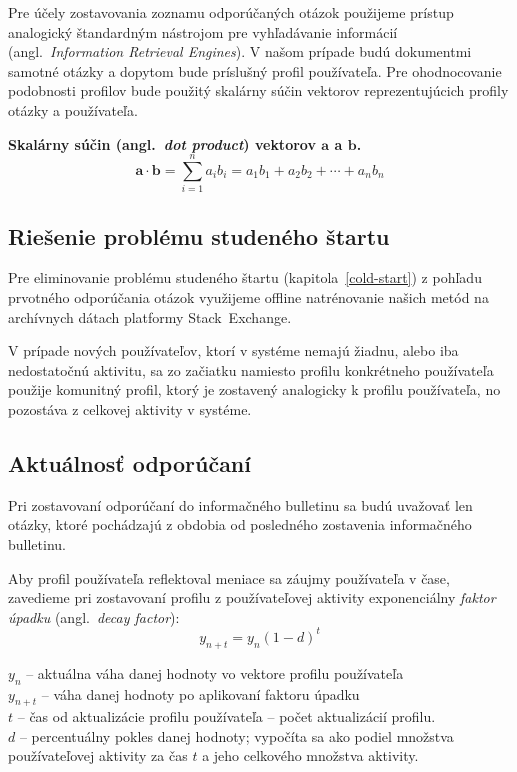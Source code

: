 Pre účely zostavovania zoznamu odporúčaných otázok použijeme prístup analogický štandardným nástrojom pre vyhľadávanie
informácií (angl.~\emph{Information Retrieval Engines}). V našom prípade budú dokumentmi samotné otázky a dopytom bude
príslušný profil používateľa. Pre ohodnocovanie podobnosti profilov bude použitý skalárny súčin vektorov reprezentujúcich
profily otázky a používateľa.

\textbf{Skalárny súčin (angl.~\textit{dot product}) vektorov $\mathbf{a}$ a $\mathbf{b}$.}\\
$$\mathbf{a}\cdot\mathbf{b}=\sum_{i=1}^n a_ib_i=a_1b_1+a_2b_2+\cdots+a_nb_n$$

\subsection{Riešenie problému studeného štartu}

Pre eliminovanie problému studeného štartu (kapitola~\ref{cold-start}) z pohľadu prvotného odporúčania otázok využijeme
offline natrénovanie našich metód na archívnych dátach platformy Stack~Exchange.

V prípade nových používateľov, ktorí v systéme nemajú žiadnu, alebo iba nedostatočnú aktivitu, sa zo začiatku namiesto profilu
konkrétneho používateľa použije komunitný profil, ktorý je zostavený analogicky k profilu používateľa, no pozostáva
z celkovej aktivity v systéme.


\subsection{Aktuálnosť odporúčaní}
\label{design:freshness}
Pri zostavovaní odporúčaní do informačného bulletinu sa budú uvažovať len otázky, ktoré pochádzajú
z obdobia od posledného zostavenia informačného bulletinu.

Aby profil používateľa reflektoval meniace sa záujmy používateľa v čase, zavedieme pri zostavovaní profilu z používateľovej
aktivity exponenciálny \textit{faktor úpadku} (angl.~\textit{decay factor}):
$$y_{n+t} = y_n (1 - d)^t$$

\begin{adjustwidth}{1cm}{1cm}
$y_n$ -- aktuálna váha danej hodnoty vo vektore profilu používateľa\\
$y_{n+t}$ -- váha danej hodnoty po aplikovaní faktoru úpadku\\
$t$ -- čas od aktualizácie profilu používateľa -- počet aktualizácií profilu.\\
$d$ -- percentuálny pokles danej hodnoty; vypočíta sa ako podiel množstva používateľovej aktivity za čas $t$ a jeho celkového množstva aktivity.
\end{adjustwidth}

